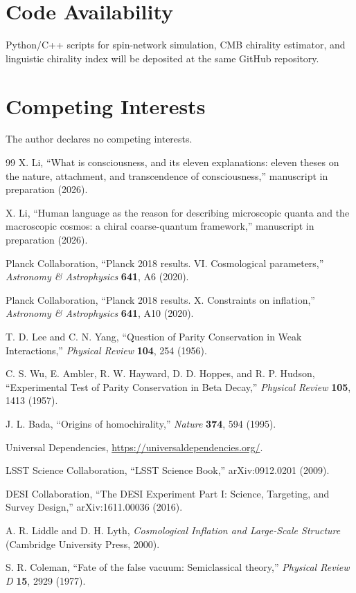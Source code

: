 \documentclass[10pt,a4paper]{article}
\begin{document}
\section*{Code Availability}
Python/C++ scripts for spin-network simulation, CMB chirality estimator, and linguistic chirality index will be deposited at the same GitHub repository.

\section*{Competing Interests}
The author declares no competing interests.

\begin{thebibliography}{99}
X. Li, ``What is consciousness, and its eleven explanations: eleven theses on the nature, attachment, and transcendence of consciousness,'' manuscript in preparation (2026).

X. Li, ``Human language as the reason for describing microscopic quanta and the macroscopic cosmos: a chiral coarse-quantum framework,'' manuscript in preparation (2026).

Planck Collaboration, ``Planck 2018 results. VI. Cosmological parameters,'' \textit{Astronomy \& Astrophysics} \textbf{641}, A6 (2020).

Planck Collaboration, ``Planck 2018 results. X. Constraints on inflation,'' \textit{Astronomy \& Astrophysics} \textbf{641}, A10 (2020).

T. D. Lee and C. N. Yang, ``Question of Parity Conservation in Weak Interactions,'' \textit{Physical Review} \textbf{104}, 254 (1956).

C. S. Wu, E. Ambler, R. W. Hayward, D. D. Hoppes, and R. P. Hudson, ``Experimental Test of Parity Conservation in Beta Decay,'' \textit{Physical Review} \textbf{105}, 1413 (1957).

J. L. Bada, ``Origins of homochirality,'' \textit{Nature} \textbf{374}, 594 (1995).

Universal Dependencies, \url{https://universaldependencies.org/}.

LSST Science Collaboration, ``LSST Science Book,'' arXiv:0912.0201 (2009).

DESI Collaboration, ``The DESI Experiment Part I: Science, Targeting, and Survey Design,'' arXiv:1611.00036 (2016).

A. R. Liddle and D. H. Lyth, \textit{Cosmological Inflation and Large-Scale Structure} (Cambridge University Press, 2000).

S. R. Coleman, ``Fate of the false vacuum: Semiclassical theory,'' \textit{Physical Review D} \textbf{15}, 2929 (1977).
\end{thebibliography}
\end{document}
